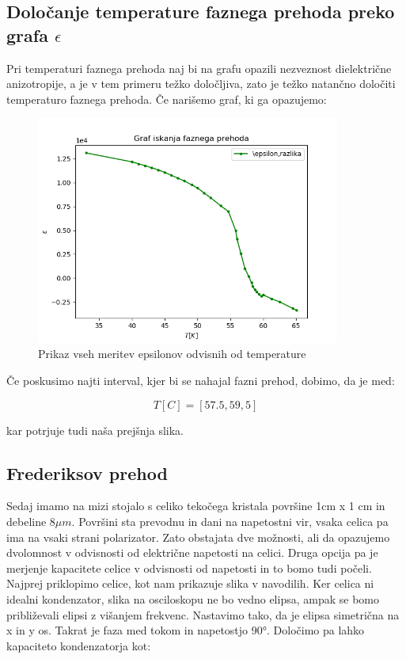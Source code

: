 \documentclass[11pt, a4paper]{article}
\theoremstyle{definition}
\theoremstyle{example}
\theoremstyle{izrek}
\begin{document}
\pagebreak

\subsection{Določanje temperature faznega prehoda preko grafa $\epsilon$}

Pri temperaturi faznega prehoda naj bi na grafu opazili nezveznost dielektrične anizotropije, a je v tem primeru težko določljiva, zato je težko natančno določiti temperaturo faznega prehoda. Če narišemo graf, ki ga opazujemo: 

\begin{figure}[H]
	\centering
    \includegraphics[width=10cm]{Fazni prehod,1.png}
    \caption{Prikaz vseh meritev epsilonov odvisnih od temperature}
\end{figure}

Če poskusimo najti interval, kjer bi se nahajal fazni prehod, dobimo, da je med:

$$T[C]=[57.5,59,5]$$

kar potrjuje tudi naša prejšnja slika.
\pagebreak
\subsection{Frederiksov prehod}
Sedaj imamo na mizi stojalo s celiko tekočega kristala površine 1cm x 1 cm in debeline $8 \mu m$. Površini sta prevodnu in dani na napetostni vir, vsaka celica pa ima na vsaki strani polarizator. Zato obstajata dve možnosti, ali da opazujemo dvolomnost v odvisnosti od električne napetosti na celici. Druga opcija pa je merjenje kapacitete celice v odvisnosti od napetosti in to bomo tudi počeli.\\
Najprej priklopimo celice, kot nam prikazuje slika v navodilih. Ker celica ni idealni kondenzator, slika na osciloskopu ne bo vedno elipsa, ampak se bomo približevali elipsi z višanjem frekvenc. Nastavimo tako, da je elipsa simetrična na x in y os.
Takrat je faza med tokom in napetostjo 90°. Določimo pa lahko kapaciteto kondenzatorja kot:
\end{document}
